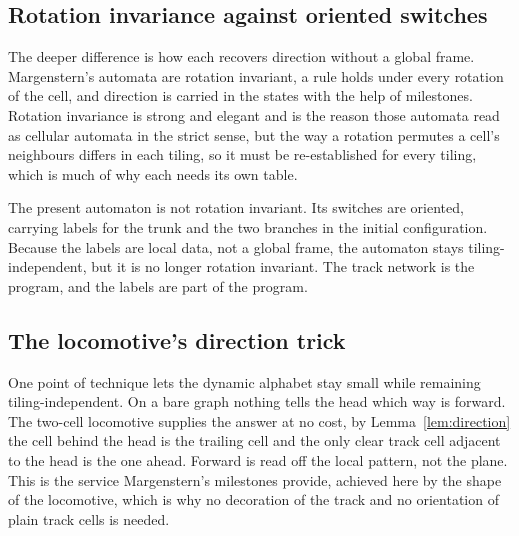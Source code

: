 \subsection{Rotation invariance against oriented switches}

The deeper difference is how each recovers direction without a global frame. Margenstern's automata are rotation
invariant, a rule holds under every rotation of the cell, and direction is carried in the states with the help
of milestones. Rotation invariance is strong and elegant and is the reason those automata read as cellular
automata in the strict sense, but the way a rotation permutes a cell's neighbours differs in each tiling, so it
must be re-established for every tiling, which is much of why each needs its own table.

The present automaton is not rotation invariant. Its switches are oriented, carrying labels for the trunk and
the two branches in the initial configuration. Because the labels are local data, not a global frame, the
automaton stays tiling-independent, but it is no longer rotation invariant. The track network is the program,
and the labels are part of the program.

\subsection{The locomotive's direction trick}

One point of technique lets the dynamic alphabet stay small while remaining tiling-independent. On a bare graph
nothing tells the head which way is forward. The two-cell locomotive supplies the answer at no cost, by
Lemma~\ref{lem:direction} the cell behind the head is the trailing cell and the only clear track cell adjacent
to the head is the one ahead. Forward is read off the local pattern, not the plane. This is the service
Margenstern's milestones provide, achieved here by the shape of the locomotive, which is why no decoration of
the track and no orientation of plain track cells is needed.
